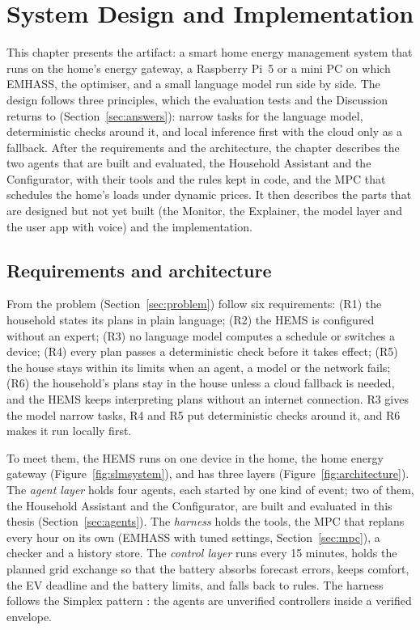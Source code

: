 \chapter{System Design and Implementation}
\label{ch:design}

This chapter presents the artifact: a smart home energy management
system that runs on the home's energy gateway, a Raspberry Pi~5 or a
mini PC on which EMHASS, the optimiser, and a small language model run
side by side. The design follows three principles, which the
evaluation tests and the Discussion returns to
(Section~\ref{sec:answers}): narrow tasks for the language model,
deterministic checks around it, and local inference first with the
cloud only as a fallback. After the requirements and the architecture,
the chapter describes the two agents that are built and evaluated, the
Household Assistant and the Configurator, with their tools and the
rules kept in code, and the MPC that schedules the home's loads under
dynamic prices. It then describes the parts that are designed but
not yet built (the Monitor, the Explainer, the model layer and the user
app with voice) and the implementation.

\section{Requirements and architecture}
\label{sec:architecture}

From the problem (Section~\ref{sec:problem}) follow six requirements:
(R1) the household states its plans in plain language; (R2) the HEMS
is configured without an expert; (R3) no language model computes a
schedule or switches a device; (R4) every plan passes a deterministic
check before it takes effect; (R5) the house stays within its limits
when an agent, a model or the network fails; (R6) the household's plans
stay in the house unless a cloud fallback is needed, and the HEMS
keeps interpreting plans without an internet connection. R3 gives the
model narrow tasks, R4 and R5 put deterministic checks around it, and
R6 makes it run locally first.

To meet them, the HEMS runs on one device in the home, the home energy
gateway (Figure~\ref{fig:slmsystem}), and has three layers
(Figure~\ref{fig:architecture}). The
\textit{agent layer} holds four agents, each started by one kind of
event; two of them, the Household Assistant and the Configurator, are
built and evaluated in this thesis (Section~\ref{sec:agents}). The \textit{harness} holds the tools, the MPC that replans every hour
on its own (EMHASS with tuned settings, Section~\ref{sec:mpc}), a
checker and a history store. The
\textit{control layer} runs every 15 minutes, holds the planned grid
exchange so that the battery absorbs forecast errors, keeps comfort,
the EV deadline and the battery limits, and falls back to rules. The
harness follows the Simplex pattern \parencite{sha2001}: the agents are
unverified controllers inside a verified envelope.

